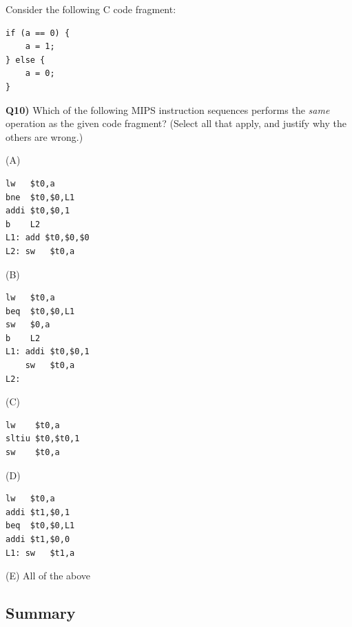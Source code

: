\begin{exercise}
Consider the following C code fragment:
\begin{lstlisting}
if (a == 0) {
    a = 1;
} else {
    a = 0;
}
\end{lstlisting}

\textbf{Q10)} Which of the following MIPS instruction sequences performs
the \emph{same} operation as the given code fragment? (Select all that
apply, and justify why the others are wrong.)

\begin{center}
\begin{minipage}[t]{0.48\linewidth}
(A)
\begin{lstlisting}
lw   $t0,a
bne  $t0,$0,L1
addi $t0,$0,1
b    L2
L1: add $t0,$0,$0
L2: sw   $t0,a
\end{lstlisting}
\end{minipage}\hfill
\begin{minipage}[t]{0.48\linewidth}
(B)
\begin{lstlisting}
lw   $t0,a
beq  $t0,$0,L1
sw   $0,a
b    L2
L1: addi $t0,$0,1
    sw   $t0,a
L2:
\end{lstlisting}
\end{minipage}

\vspace{0.4cm}

\begin{minipage}[t]{0.48\linewidth}
(C)
\begin{lstlisting}
lw    $t0,a
sltiu $t0,$t0,1
sw    $t0,a
\end{lstlisting}
\end{minipage}\hfill
\begin{minipage}[t]{0.48\linewidth}
(D)
\begin{lstlisting}
lw   $t0,a
addi $t1,$0,1
beq  $t0,$0,L1
addi $t1,$0,0
L1: sw   $t1,a
\end{lstlisting}
\end{minipage}

\vspace{0.4cm}
(E) All of the above
\end{center}
\end{exercise}

\subsection{Summary}

